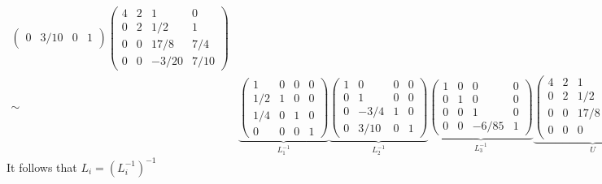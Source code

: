 \documentclass[12pt]{article}
\begin{document}
\begin{align*}
\begin{pmatrix}
				0 & 3/10 & 0 & 1 
				\end{pmatrix}
				\begin{pmatrix}
				4 & 2 & 1 & 0 \\ 
				0 & 2 & 1/2 & 1 \\
				0 & 0 & 17/8 & 7/4 \\
				0 & 0 & -3/20 & 7/10 
				\end{pmatrix} \\
				\sim&\underbrace{\begin{pmatrix}
				1 & 0 & 0 & 0 \\
				1/2 & 1 & 0 & 0 \\
				1/4 & 0 & 1 & 0 \\
				0 & 0 & 0 & 1 
				\end{pmatrix}}_{L_{1}^{-1}}
				\underbrace{\begin{pmatrix}
				1 & 0 & 0 & 0 \\
				0 & 1 & 0 & 0 \\
				0 & -3/4 & 1 & 0 \\
				0 & 3/10 & 0 & 1 
				\end{pmatrix}}_{L_{2}^{-1}}
				\underbrace{\begin{pmatrix}
				1 & 0 & 0 & 0 \\
				0 & 1 & 0 & 0 \\
				0 & 0 & 1 & 0 \\
				0 & 0 & -6/85 & 1 
				\end{pmatrix}}_{L_{3}^{-1}}
				\underbrace{\begin{pmatrix}
				4 & 2 & 1 & 0 \\ 
				0 & 2 & 1/2 & 1 \\
				0 & 0 & 17/8 & 7/4 \\
				0 & 0 & 0 & 14/17
				\end{pmatrix}}_{U}
			\end{align*}
			It follows that $L_{i} = (L_{i}^{-1})^{-1}$
\end{document}
